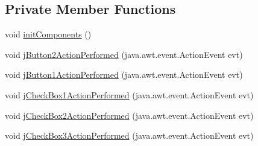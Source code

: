 \subsection*{Private Member Functions}
\begin{DoxyCompactItemize}
\item 
void \mbox{\hyperlink{classsoftware_1_1_aceptar_peticiones_a18fadc32c6a77b286202be5dfbdb11b2}{init\+Components}} ()
\item 
void \mbox{\hyperlink{classsoftware_1_1_aceptar_peticiones_aee913c83480bd79452ad78c860ee2dba}{j\+Button2\+Action\+Performed}} (java.\+awt.\+event.\+Action\+Event evt)
\item 
void \mbox{\hyperlink{classsoftware_1_1_aceptar_peticiones_ad0a52e08d96fc121660bf6c65ee56b88}{j\+Button1\+Action\+Performed}} (java.\+awt.\+event.\+Action\+Event evt)
\item 
void \mbox{\hyperlink{classsoftware_1_1_aceptar_peticiones_a290ec180fd67647791d5ae0c9868b588}{j\+Check\+Box1\+Action\+Performed}} (java.\+awt.\+event.\+Action\+Event evt)
\item 
void \mbox{\hyperlink{classsoftware_1_1_aceptar_peticiones_ae615808bf27e05f1c9368e352141520e}{j\+Check\+Box2\+Action\+Performed}} (java.\+awt.\+event.\+Action\+Event evt)
\item 
void \mbox{\hyperlink{classsoftware_1_1_aceptar_peticiones_a62c8bfdd7cd94d40d2629a094e2e5252}{j\+Check\+Box3\+Action\+Performed}} (java.\+awt.\+event.\+Action\+Event evt)
\end{DoxyCompactItemize}
